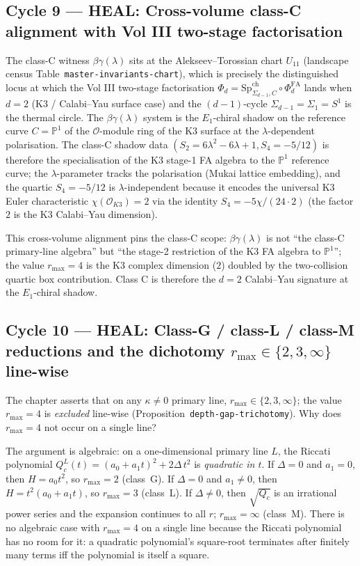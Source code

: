 \subsection*{Cycle 9 --- HEAL: Cross-volume class-C alignment
with Vol III two-stage factorisation}

The class-C witness $\beta\gamma(\lambda)$ sits at the
Alekseev--Torossian chart $U_{11}$ (landscape census
Table~\texttt{master-invariants-chart}), which is precisely the
distinguished locus at which the Vol III two-stage factorisation
$\Phi_d = \mathrm{Sp}^{\mathrm{ch}}_{\Sigma_{d-1}, C} \circ
\Phi^{\mathrm{FA}}_d$ lands when $d = 2$ (K3 / Calabi--Yau surface
case) and the $(d-1)$-cycle $\Sigma_{d-1} = \Sigma_1 = S^1$ is the
thermal circle. The $\beta\gamma(\lambda)$ system is the
$E_1$-chiral shadow on the reference curve $C = \mathbb P^1$ of
the $\mathcal{O}$-module ring of the K3 surface at the
$\lambda$-dependent polarisation. The class-C shadow data
$(S_2 = 6\lambda^2 - 6\lambda + 1, S_4 = -5/12)$ is therefore the
specialisation of the K3 stage-1 FA algebra to the $\mathbb P^1$
reference curve; the $\lambda$-parameter tracks the polarisation
(Mukai lattice embedding), and the quartic $S_4 = -5/12$ is
$\lambda$-independent because it encodes the universal K3 Euler
characteristic $\chi(\mathcal{O}_{K3}) = 2$ via the identity
$S_4 = -5\chi/(24\cdot 2)$ (the factor $2$ is the K3 Calabi--Yau
dimension).

This cross-volume alignment pins the class-C scope: $\beta\gamma
(\lambda)$ is not ``the class-C primary-line algebra'' but ``the
stage-2 restriction of the K3 FA algebra to $\mathbb P^1$''; the
value $r_{\max} = 4$ is the K3 complex dimension ($2$) doubled by
the two-collision quartic box contribution. Class C is therefore
the $d = 2$ Calabi--Yau signature at the $E_1$-chiral shadow.

\subsection*{Cycle 10 --- HEAL: Class-G / class-L / class-M
reductions and the dichotomy $r_{\max} \in \{2, 3, \infty\}$
line-wise}

The chapter asserts that on any $\kappa \ne 0$ primary line,
$r_{\max} \in \{2, 3, \infty\}$; the value $r_{\max} = 4$ is
\emph{excluded} line-wise (Proposition~\texttt{depth-gap-trichotomy}).
Why does $r_{\max} = 4$ not occur on a single line?

The argument is algebraic: on a one-dimensional primary line $L$,
the Riccati polynomial $Q_c^L(t) = (a_0 + a_1 t)^2 + 2\Delta\,t^2$ is
\emph{quadratic in $t$}. If $\Delta = 0$ and $a_1 = 0$, then
$H = a_0 t^2$, so $r_{\max} = 2$ (class~G). If $\Delta = 0$ and
$a_1 \ne 0$, then $H = t^2 (a_0 + a_1 t)$, so $r_{\max} = 3$
(class~L). If $\Delta \ne 0$, then $\sqrt{Q_c}$ is an irrational
power series and the expansion continues to all $r$; $r_{\max} =
\infty$ (class~M). There is no algebraic case with $r_{\max} = 4$
on a single line because the Riccati polynomial has no room for it:
a quadratic polynomial's square-root terminates after finitely many
terms iff the polynomial is itself a square.

